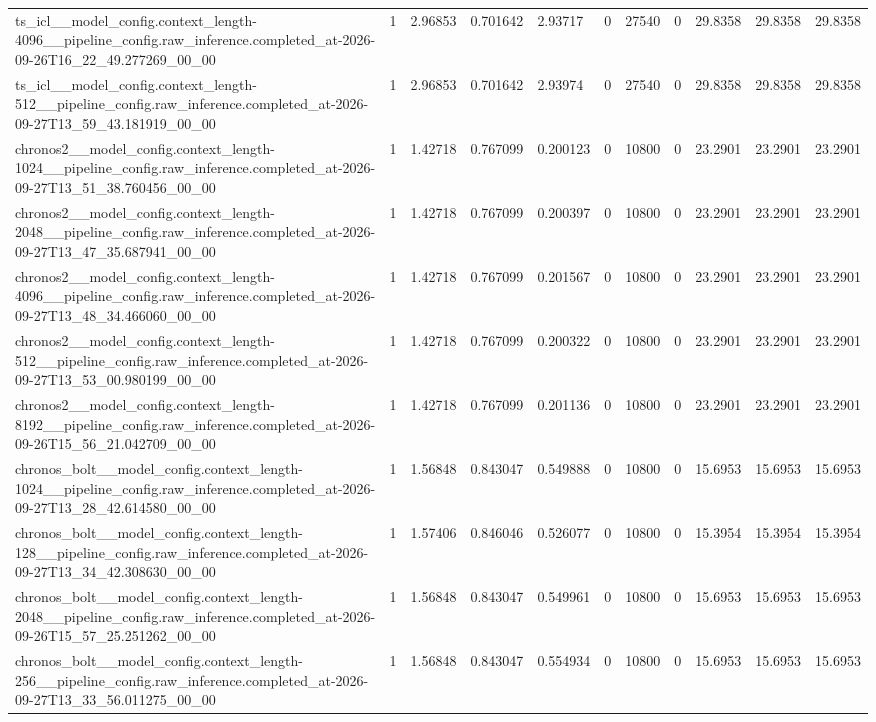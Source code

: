 \begin{tabular}{lllllllllll}
ts\_icl\_\_model\_config.context\_length-4096\_\_pipeline\_config.raw\_inference.completed\_at-2026-09-26T16\_22\_49.277269\_00\_00 & 1 & 2.96853 & 0.701642 & 2.93717 & 0 & 27540 & 0 & 29.8358 & 29.8358 & 29.8358 \\
ts\_icl\_\_model\_config.context\_length-512\_\_pipeline\_config.raw\_inference.completed\_at-2026-09-27T13\_59\_43.181919\_00\_00 & 1 & 2.96853 & 0.701642 & 2.93974 & 0 & 27540 & 0 & 29.8358 & 29.8358 & 29.8358 \\
chronos2\_\_model\_config.context\_length-1024\_\_pipeline\_config.raw\_inference.completed\_at-2026-09-27T13\_51\_38.760456\_00\_00 & 1 & 1.42718 & 0.767099 & 0.200123 & 0 & 10800 & 0 & 23.2901 & 23.2901 & 23.2901 \\
chronos2\_\_model\_config.context\_length-2048\_\_pipeline\_config.raw\_inference.completed\_at-2026-09-27T13\_47\_35.687941\_00\_00 & 1 & 1.42718 & 0.767099 & 0.200397 & 0 & 10800 & 0 & 23.2901 & 23.2901 & 23.2901 \\
chronos2\_\_model\_config.context\_length-4096\_\_pipeline\_config.raw\_inference.completed\_at-2026-09-27T13\_48\_34.466060\_00\_00 & 1 & 1.42718 & 0.767099 & 0.201567 & 0 & 10800 & 0 & 23.2901 & 23.2901 & 23.2901 \\
chronos2\_\_model\_config.context\_length-512\_\_pipeline\_config.raw\_inference.completed\_at-2026-09-27T13\_53\_00.980199\_00\_00 & 1 & 1.42718 & 0.767099 & 0.200322 & 0 & 10800 & 0 & 23.2901 & 23.2901 & 23.2901 \\
chronos2\_\_model\_config.context\_length-8192\_\_pipeline\_config.raw\_inference.completed\_at-2026-09-26T15\_56\_21.042709\_00\_00 & 1 & 1.42718 & 0.767099 & 0.201136 & 0 & 10800 & 0 & 23.2901 & 23.2901 & 23.2901 \\
chronos\_bolt\_\_model\_config.context\_length-1024\_\_pipeline\_config.raw\_inference.completed\_at-2026-09-27T13\_28\_42.614580\_00\_00 & 1 & 1.56848 & 0.843047 & 0.549888 & 0 & 10800 & 0 & 15.6953 & 15.6953 & 15.6953 \\
chronos\_bolt\_\_model\_config.context\_length-128\_\_pipeline\_config.raw\_inference.completed\_at-2026-09-27T13\_34\_42.308630\_00\_00 & 1 & 1.57406 & 0.846046 & 0.526077 & 0 & 10800 & 0 & 15.3954 & 15.3954 & 15.3954 \\
chronos\_bolt\_\_model\_config.context\_length-2048\_\_pipeline\_config.raw\_inference.completed\_at-2026-09-26T15\_57\_25.251262\_00\_00 & 1 & 1.56848 & 0.843047 & 0.549961 & 0 & 10800 & 0 & 15.6953 & 15.6953 & 15.6953 \\
chronos\_bolt\_\_model\_config.context\_length-256\_\_pipeline\_config.raw\_inference.completed\_at-2026-09-27T13\_33\_56.011275\_00\_00 & 1 & 1.56848 & 0.843047 & 0.554934 & 0 & 10800 & 0 & 15.6953 & 15.6953 & 15.6953 \\

\end{tabular}
